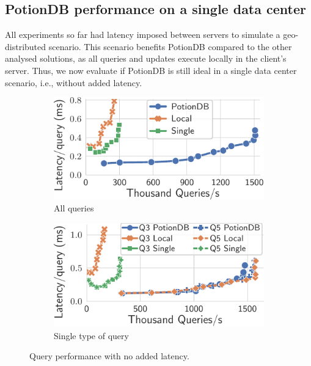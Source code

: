 \documentclass[sigplan,review,anonymous]{acmart}
\begin{document}
\subsection{PotionDB performance on a single data center}

All experiments so far had latency imposed between servers to simulate a geo-distributed scenario.
This scenario benefits PotionDB compared to the other analysed solutions, as all queries and updates execute locally in the client's server.
Thus, we now evaluate if PotionDB is still ideal in a single data center scenario, i.e., without added latency. %

\begin{figure}
	\centering
	\begin{subfigure}{.49\linewidth}
		\includegraphics[width=1\linewidth]{singleQuery/all_queries_noTC}
		\caption{All queries}
		\label{fig:all_queries_noTC}
	\end{subfigure}%
	\hspace*{0.2em}
	\begin{subfigure}{.49\linewidth}
		\includegraphics[width=1\linewidth]{singleQuery/q3_q5_noLatency}
		\caption{Single type of query}
		\label{fig:q3_q5_noTC}
	\end{subfigure}%
	\vspace*{-0.65em}
	\caption{Query performance with no added latency.}
	\label{fig:global_local_single_noTC}
	\vspace*{-1.2em}
\end{figure}
\end{document}
